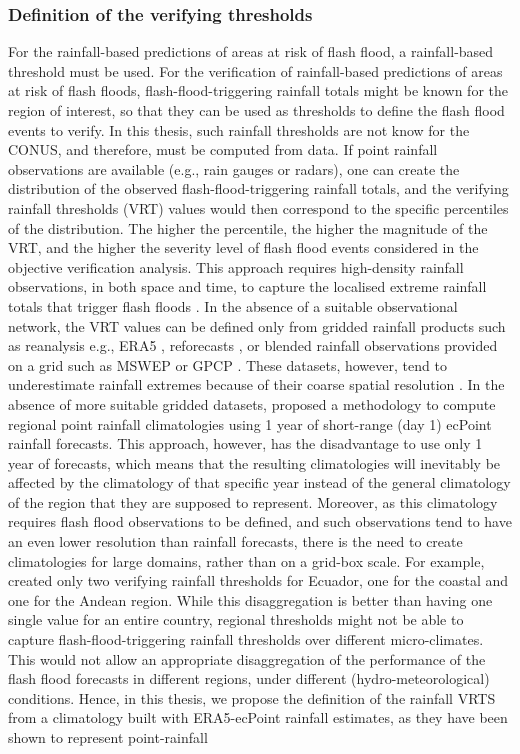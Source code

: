 \subsubsection{Definition of the verifying thresholds}
\label{verifying_rainfall_threshold}
For the rainfall-based predictions of areas at risk of flash flood, a rainfall-based threshold must be used. For the verification of rainfall-based predictions of areas at risk of flash floods, flash-flood-triggering rainfall totals might be known for the region of interest, so that they can be used as thresholds to define the flash flood events to verify. In this thesis, such rainfall thresholds are not know for the CONUS, and therefore, must be computed from data. If point rainfall observations are available (e.g., rain gauges or radars), one can create the distribution of the observed flash-flood-triggering rainfall totals, and the verifying rainfall thresholds (VRT) values would then correspond to the specific percentiles of the distribution. The higher the percentile, the higher the magnitude of the VRT, and the higher the severity level of flash flood events considered in the objective verification analysis. This approach requires high-density rainfall observations, in both space and time, to capture the localised extreme rainfall totals that trigger flash floods \citep{Haiden_2016, RamosFilho_2021}. In the absence of a suitable observational network, the VRT values can be defined only from gridded rainfall products such as reanalysis e.g., ERA5 \citep{Hersbach_2020}, reforecasts \citep{Hamill_2006b}, or blended rainfall observations provided on a grid such as MSWEP \citep{Beck_2019} or GPCP \citep{Adler_2018}. These datasets, however, tend to underestimate rainfall extremes because of their coarse spatial resolution \citep{Tapiador_2019}. In the absence of more suitable gridded datasets, \citet{Pillosu_2024} proposed a methodology to compute regional point rainfall climatologies using 1 year of short-range (day 1) ecPoint rainfall forecasts. This approach, however, has the disadvantage to use only 1 year of forecasts, which means that the resulting climatologies will inevitably be affected by the climatology of that specific year instead of the general climatology of the region that they are supposed to represent. Moreover, as this climatology requires flash flood observations to be defined, and such observations tend to have an even lower resolution than rainfall forecasts, there is the need to create climatologies for large domains, rather than on a grid-box scale. For example, \citet{Pillosu_2024} created only two verifying rainfall thresholds for Ecuador, one for the coastal and one for the Andean region. While this disaggregation is better than having one single value for an entire country, regional thresholds might not be able to capture flash-flood-triggering rainfall thresholds over different micro-climates. This would not allow an appropriate disaggregation of the performance of the flash flood forecasts in different regions, under different (hydro-meteorological) conditions. Hence, in this thesis, we propose the definition of the rainfall VRTS from a climatology built with ERA5-ecPoint rainfall estimates, as they have been shown to represent point-rainfall 